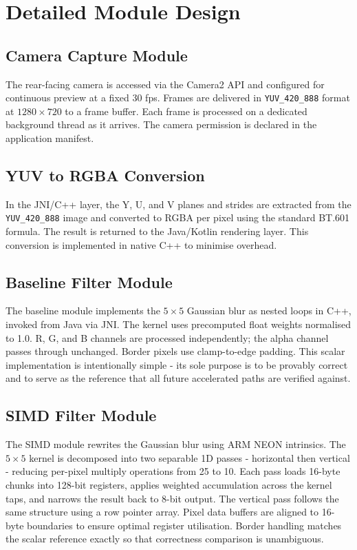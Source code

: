 \documentclass[12pt, a4paper]{article}
\begin{document}
\section{Detailed Module Design}

\subsection{Camera Capture Module}
The rear-facing camera is accessed via the Camera2 API and configured for continuous preview
at a fixed 30 fps. Frames are delivered in \texttt{YUV\_420\_888} format at $1280 \times 720$
to a frame buffer. Each frame is processed on a dedicated background thread as it arrives.
The camera permission is declared in the application manifest.

\subsection{YUV to RGBA Conversion}
In the JNI/C++ layer, the Y, U, and V planes and strides are extracted from the
\texttt{YUV\_420\_888} image and converted to RGBA per pixel using the standard BT.601 formula.
The result is returned to the Java/Kotlin rendering layer. This conversion is implemented in
native C++ to minimise overhead.

\subsection{Baseline Filter Module}
The baseline module implements the $5 \times 5$ Gaussian blur as nested loops in C++, invoked
from Java via JNI. The kernel uses precomputed float weights normalised to 1.0. R, G, and B
channels are processed independently; the alpha channel passes through unchanged. Border pixels
use clamp-to-edge padding. This scalar implementation is intentionally simple - its sole purpose
is to be provably correct and to serve as the reference that all future accelerated paths are
verified against.

\subsection{SIMD Filter Module}
The SIMD module rewrites the Gaussian blur using ARM NEON intrinsics. The $5 \times 5$ kernel
is decomposed into two separable 1D passes - horizontal then vertical - reducing per-pixel
multiply operations from 25 to 10. Each pass loads 16-byte chunks into 128-bit registers,
applies weighted accumulation across the kernel taps, and narrows the result back to 8-bit
output. The vertical pass follows the same structure using a row pointer array. Pixel data buffers are
aligned to 16-byte boundaries to ensure optimal register utilisation. Border handling matches
the scalar reference exactly so that correctness comparison is unambiguous.
\end{document}
